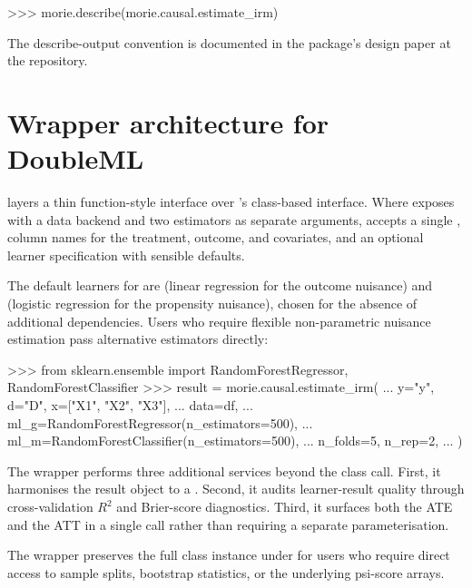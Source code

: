\documentclass[article,shortnames,nojss]{jss}
\begin{document}
\begin{Code}
>>> morie.describe(morie.causal.estimate_irm)
\end{Code}

\noindent The describe-output convention is documented in the
package's design paper at the repository.

\section{Wrapper architecture for DoubleML}
\label{sec:wrapper}

 layers a thin function-style interface over
's class-based interface. Where 
exposes  with a data
backend and two  estimators as separate
arguments,  accepts a single
 , column names for the treatment,
outcome, and covariates, and an optional learner specification
with sensible defaults.

The default learners for  are
 (linear regression for the outcome
nuisance) and  (logistic regression
for the propensity nuisance), chosen for the absence of
additional dependencies. Users who require flexible non-parametric
nuisance estimation pass alternative  estimators
directly:

\begin{Code}
>>> from sklearn.ensemble import RandomForestRegressor, RandomForestClassifier
>>> result = morie.causal.estimate_irm(
...     y="y", d="D", x=["X1", "X2", "X3"],
...     data=df,
...     ml_g=RandomForestRegressor(n_estimators=500),
...     ml_m=RandomForestClassifier(n_estimators=500),
...     n_folds=5, n_rep=2,
... )
\end{Code}

\noindent The wrapper performs three additional services beyond
the  class call. First, it harmonises the result
object to a . Second, it audits learner-result
quality through cross-validation $R^{2}$ and Brier-score
diagnostics. Third, it surfaces both the ATE and the ATT in a
single call rather than requiring a separate 
parameterisation.

The wrapper preserves the full  class instance under
 for users who require direct access to
sample splits, bootstrap statistics, or the underlying psi-score
arrays.
\end{document}
